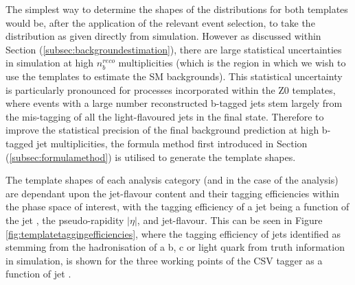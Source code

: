 The simplest way to determine the shapes of the \nbreco distributions for both templates would be, after the application of the relevant event selection, to take the \nbreco distribution as given directly from simulation. However as discussed within Section (\ref{subsec:backgroundestimation}), there are large statistical uncertainties in simulation at high $n_{b}^{reco}$ multiplicities (which is the region in which we wish to use the templates to estimate the \ac{SM} backgrounds). This statistical uncertainty is particularly pronounced for processes incorporated within the Z0 templates, where events with a large number reconstructed b-tagged jets stem largely from the mis-tagging of all the light-flavoured jets in the final state. Therefore to improve the statistical precision of the final background prediction at high b-tagged jet multiplicities, the formula method first introduced in Section (\ref{subsec:formulamethod}) is utilised to generate the template shapes. 

The template shapes of each analysis category (\theht and \njet in the case of the \alphat analysis) are dependant upon the jet-flavour content and their tagging efficiencies within the phase space of interest, with the tagging efficiency of a jet being a function of the jet \pt, the pseudo-rapidity $\rvert\eta\lvert$, and jet-flavour. This can be seen in Figure \ref{fig:templatetaggingefficiencies}, where the tagging efficiency of jets identified as stemming from the hadronisation of a b, c or light quark from truth information in simulation, is shown for the three working points of the \ac{CSV} tagger as a function of jet \pt. 

